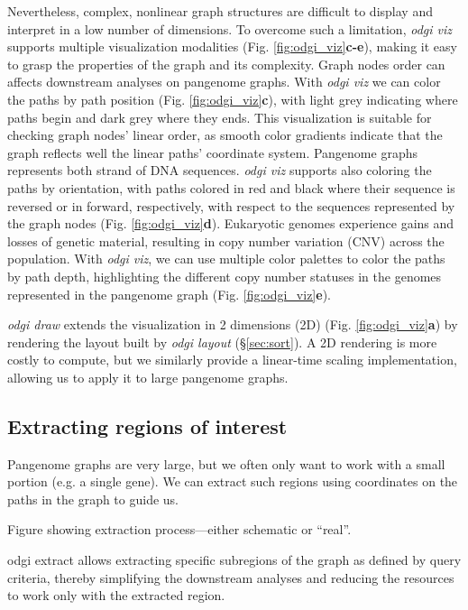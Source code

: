 \documentclass{bioinfo}
\begin{document}
Nevertheless, complex, nonlinear graph structures are difficult to display and interpret in a low number of dimensions.
To overcome such a limitation, \textit{odgi viz} supports multiple visualization modalities (Fig. \ref{fig:odgi_viz}\textbf{c-e}), making it easy to grasp the properties of the graph and its complexity.
Graph nodes order can affects downstream analyses on pangenome graphs. With \textit{odgi viz} we can color the paths by path position (Fig. \ref{fig:odgi_viz}\textbf{c}), with light grey indicating where paths begin and dark grey where they ends.
This visualization is suitable for checking graph nodes' linear order, as smooth color gradients indicate that the graph reflects well the linear paths' coordinate system.
Pangenome graphs represents both strand of DNA sequences.
\textit{odgi viz} supports also coloring the paths by orientation, with paths colored in red and black where their sequence is reversed or in forward, respectively, with respect to the sequences represented by the graph nodes (Fig. \ref{fig:odgi_viz}\textbf{d}).
Eukaryotic genomes experience gains and losses of genetic material, resulting in copy number variation (CNV) across the population.
With \textit{odgi viz}, we can use multiple color palettes to color the paths by path depth, highlighting the different copy number statuses in the genomes represented in the pangenome graph (Fig. \ref{fig:odgi_viz}\textbf{e}).


\textit{odgi draw} extends the visualization in 2 dimensions (2D)  (Fig. \ref{fig:odgi_viz}\textbf{a}) by rendering the layout built by \textit{odgi layout} (\S\ref{sec:sort}). A 2D rendering is more costly to compute, but we similarly provide a linear-time scaling implementation, allowing us to apply it to large pangenome graphs.


\subsection{Extracting regions of interest}
\label{sec:extract}


Pangenome graphs are very large, but we often only want to work with a small portion (e.g. a single gene).
We can extract such regions using coordinates on the paths in the graph to guide us.

Figure showing extraction process---either schematic or ``real''.

odgi extract allows extracting specific subregions of the graph as defined by query criteria, thereby simplifying the downstream analyses and reducing the resources to work only with the extracted region.
\end{document}
